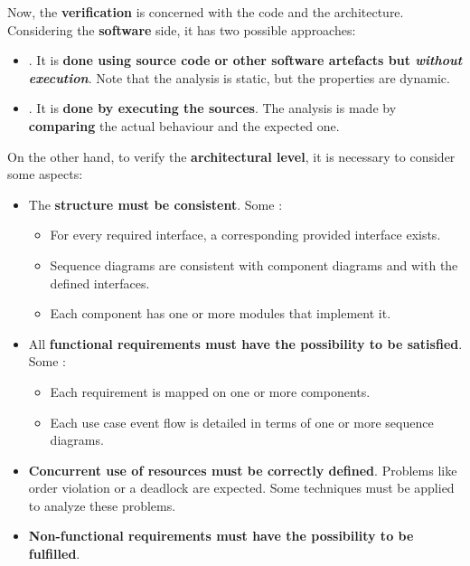 \highspace
Now, the \textbf{verification} is concerned with the code and the architecture. Considering the \textbf{software} side, it has two possible approaches:
\begin{itemize}
    \item {}. It is \textbf{done using source code or other software artefacts but \emph{without execution}}. Note that the analysis is static, but the properties are dynamic.

    \item {}. It is \textbf{done by executing the sources}. The analysis is made by \textbf{comparing} the actual behaviour and the expected one.
\end{itemize}
On the other hand, to verify the \textbf{architectural level}, it is necessary to consider some aspects:
\begin{itemize}
    \item The \textbf{structure must be consistent}. Some :
    \begin{itemize}
        \item For every required interface, a corresponding provided interface exists.
        
        \item Sequence diagrams are consistent with component diagrams and with the defined interfaces.
        
        \item Each component has one or more modules that implement it.
    \end{itemize}

    \item All \textbf{functional requirements must have the possibility to be satisfied}. Some :
    \begin{itemize}
        \item Each requirement is mapped on one or more components.
        
        \item Each use case event flow is detailed in terms of one or more sequence diagrams.
    \end{itemize}

    \item \textbf{Concurrent use of resources must be correctly defined}. Problems like order violation or a deadlock are expected. Some techniques must be applied to analyze these problems. 
    
    \item \textbf{Non-functional requirements must have the possibility to be fulfilled}.
\end{itemize}